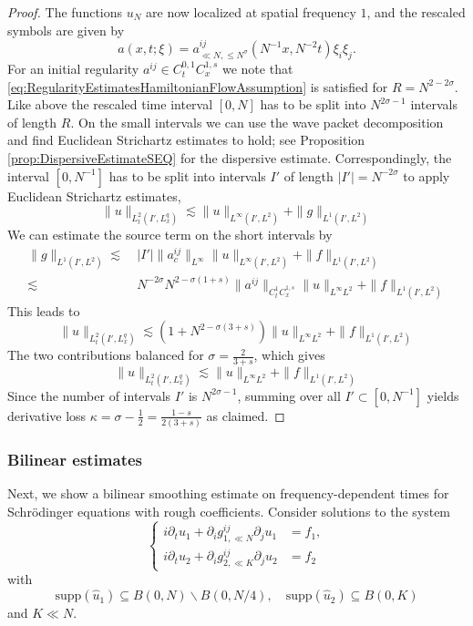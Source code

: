 \documentclass{amsart}
\theoremstyle{definition}
\begin{document}
\begin{proof}
The functions $u_N$ are now localized at spatial frequency $1$, and the rescaled symbols are given by
\begin{equation*}
a(x,t;\xi)= a_{\ll N, \leq N^{\sigma}}^{ij}(N^{-1} x, N^{-2}t) \xi_i \xi_j.
\end{equation*}
For an initial regularity $a^{ij} \in C^{0,1}_t C^{1,s}_x$ we note that \eqref{eq:RegularityEstimatesHamiltonianFlowAssumption} is satisfied for $R=N^{2-2 \sigma}$. Like above the rescaled time interval $[0,N]$ has to be split into $N^{2\sigma - 1}$ intervals of length $R$. On the small intervals we can use the wave packet decomposition and find Euclidean Strichartz estimates to hold; see Proposition \ref{prop:DispersiveEstimateSEQ} for the dispersive estimate. Correspondingly, the interval $[0,N^{-1}]$ has to be split into intervals $I'$ of length $|I'| = N^{-2\sigma}$ to apply Euclidean Strichartz estimates,
\[
 \| u\|_{L_t^2(I',L^q_x)} \lesssim \|u\|_{L^\infty(I', L^2)}
 + \|g\|_{L^1(I', L^2)}
\]
We can estimate the source term on the short intervals by 
\[
\begin{aligned}
\|g\|_{L^1(I', L^2)} \lesssim & \  |I'| \|a^{ij}_{c}\|_{L^\infty}
\| u \|_{L^\infty(I', L^2)} + \|f\| _{L^1(I', L^2)}
\\
\lesssim  & \  N^{-2\sigma} N^{2-\sigma(1+ s)} \| a^{ij} \|_{C^1_t C_x^{1,s}}\| u \|_{L^\infty L^2} + \|f\| _{L^1(I', L^2)}
\end{aligned}
\]
This leads to
\[
 \| u\|_{L_t^2(I',L^q_x)} \lesssim
 (1+ N^{2-\sigma(3+ s)}) \|u\|_{L^\infty L^2}
 + \|f\|_{L^1(I', L^2)}
\]
The two contributions balanced for $\sigma = \frac{2}{3+s}$, which gives
\[
 \| u\|_{L_t^2(I',L^q_x)} \lesssim
  \|u\|_{L^\infty L^2}
 + \|f\|_{L^1(I', L^2)}
\]
Since the number of intervals $I'$ is $N^{2\sigma -1}$,
summing over all $I' \subset [0,N^{-1}]$ yields 
derivative loss $\kappa = \sigma - \frac12 =  \frac{1-s}{2(3+s)}$ as claimed.

\end{proof}

\subsubsection{Bilinear estimates}

Next, we show a bilinear smoothing estimate on frequency-dependent times for Schr\"odinger equations with rough coefficients. Consider solutions to the system
\begin{equation*}
\left\{ \begin{array}{cl}
i \partial_t u_1 + \partial_i g^{ij}_{1, \ll N} \partial_j u_1 &= f_1, \\
i \partial_t u_2 + \partial_i g^{ij}_{2, \ll K} \partial_j u_2 &= f_2
\end{array} \right.
\end{equation*}
with
\begin{equation*}
\text{supp}(\hat{u}_1) \subseteq B(0,N) \backslash B(0,N/4), \quad \text{supp}(\hat{u}_2) \subseteq B(0,K)
\end{equation*}
and $K \ll N$. 
\end{document}
